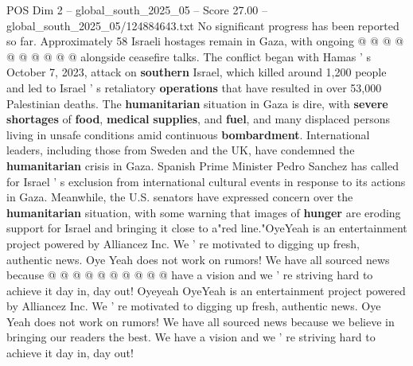 \begin{textsample}{POS Dim 2 – global\_south\_2025\_05 – Score 27.00 – global\_south\_2025\_05/124884643.txt}
No significant progress has been reported so far.
Approximately 58 Israeli hostages remain in Gaza, with ongoing @ @ @ @ @ @ @ @ @ @ alongside ceasefire talks.
The conflict began with Hamas ' s October 7, 2023, attack on \textbf{southern} Israel, which killed around 1,200 people and led to Israel ' s retaliatory \textbf{operations} that have resulted in over 53,000 Palestinian deaths.
The \textbf{humanitarian} situation in Gaza is dire, with \textbf{severe} \textbf{shortages} of \textbf{food}, \textbf{medical} \textbf{supplies}, and \textbf{fuel}, and many displaced persons living in unsafe conditions amid continuous \textbf{bombardment}.
International leaders, including those from Sweden and the UK, have condemned the \textbf{humanitarian} crisis in Gaza.
Spanish Prime Minister Pedro Sanchez has called for Israel ' s exclusion from international cultural events in response to its actions in Gaza.
Meanwhile, the U.S. senators have expressed concern over the \textbf{humanitarian} situation, with some warning that images of \textbf{hunger} are eroding support for Israel and bringing it close to a"red line."OyeYeah is an entertainment project powered by Alliancez Inc.
We ' re motivated to digging up fresh, authentic news.
Oye Yeah does not work on rumors!
We have all sourced news because @ @ @ @ @ @ @ @ @ @ have a vision and we ' re striving hard to achieve it day in, day out!
Oyeyeah OyeYeah is an entertainment project powered by Alliancez Inc.
We ' re motivated to digging up fresh, authentic news.
Oye Yeah does not work on rumors!
We have all sourced news because we believe in bringing our readers the best.
We have a vision and we ' re striving hard to achieve it day in, day out!

\end{textsample}
